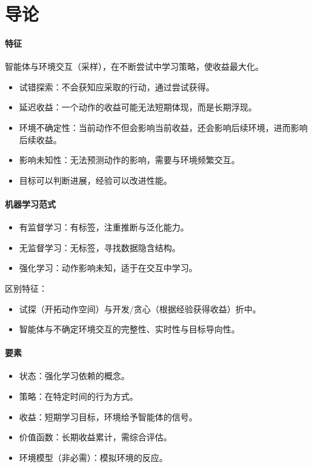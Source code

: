 \documentclass[
12pt, %
a4paper, 
oneside, %
headinclude,footinclude, %
]{scrartcl}
\title{\normalfont\spacedallcaps{强化学习}}
\date{}
\begin{document}
\maketitle
\newpage
\tableofcontents 
\newpage
\listoffigures
\listoftables
\listoftips
\newpage
\section{导论}
\paragraph{特征}
智能体与环境交互（采样），在不断尝试中学习策略，使收益最大化。
\begin{itemize}
\item 试错探索：不会获知应采取的行动，通过尝试获得。
\item 延迟收益：一个动作的收益可能无法短期体现，而是长期浮现。
\item 环境不确定性：当前动作不但会影响当前收益，还会影响后续环境，进而影响后续收益。
\item 影响未知性：无法预测动作的影响，需要与环境频繁交互。
\item 目标可以判断进展，经验可以改进性能。
\end{itemize}
\paragraph{机器学习范式}
\begin{itemize}
\item 有监督学习：有标签，注重推断与泛化能力。
\item 无监督学习：无标签，寻找数据隐含结构。
\item 强化学习：动作影响未知，适于在交互中学习。
\end{itemize}

区别特征：
\begin{itemize}
\item 试探（开拓动作空间）与开发/贪心（根据经验获得收益）折中。
\item 智能体与不确定环境交互的完整性、实时性与目标导向性。
\end{itemize}
\paragraph{要素}
\begin{itemize}
\item 状态：强化学习依赖的概念。
\item 策略：在特定时间的行为方式。
\item 收益：短期学习目标，环境给予智能体的信号。
\item 价值函数：长期收益累计，需综合评估。
\item 环境模型（非必需）：模拟环境的反应。
\end{itemize}
\end{document}
